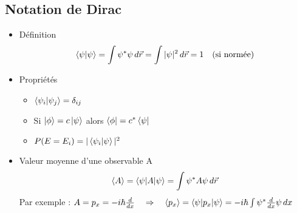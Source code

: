 \subsection*{Notation de Dirac}
\begin{itemize}
	\item Définition 
		\begin{equation}
			\braket{\psi | \psi} =  \int \psi ^* \psi \, d\vec{r} = \int |\psi |^2 \, d\vec{r}= 1 \quad \mbox{(si normée)}
		\end{equation}
	
	\item Propriétés 
		\begin{itemize}
			\item $\braket{\psi _i | \psi _j} = \delta _{ij}$
			\item Si $\ket{\phi} = c\ket{\psi}$ alors $\bra{\phi} = c^* \bra{\psi}$
			\item $P(E = E_i) = | \braket{\psi _i | \psi} |^2$
		\end{itemize}

	\item Valeur moyenne d'une observable A
		\begin{equation}
			\braket{A} = \braket{\psi | A | \psi} = \int \psi ^* A \psi \, d\vec{r}
		\end{equation}
		Par exemple : $A = p_x = -i \hbar \frac{d}{dx} \quad \Rightarrow \quad  \braket{p_x} = \braket{\psi | p_x | \psi} = -i\hbar \int \psi^* \frac{d}{dx} \psi \, dx$
\end{itemize}